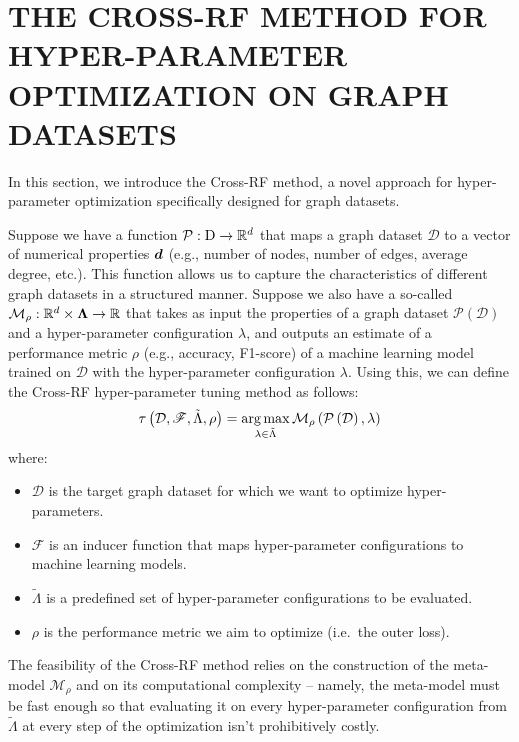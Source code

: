 \section{\uppercase{The Cross-RF Method for Hyper-Parameter Optimization on Graph Datasets}}

In this section, we introduce the Cross-RF method, a novel approach for hyper-parameter optimization specifically designed for graph datasets.

Suppose we have a  function \( \mathcal{P} : \mathrm{D} \to \mathbb{R}^d \) that maps a graph dataset \( \mathcal{D} \) to a vector of numerical properties \( \boldsymbol{d} \) (e.g., number of nodes, number of edges, average degree, etc.). This function allows us to capture the characteristics of different graph datasets in a structured manner. Suppose we also have a so-called  \( \mathcal{M}_\rho : \mathbb{R}^d \times \boldsymbol\Lambda \to \mathbb{R} \) that takes as input the properties of a graph dataset \( \mathcal{P} \left( \mathcal{D} \right) \) and a hyper-parameter configuration \( \lambda \), and outputs an estimate of a performance metric \( \rho \) (e.g., accuracy, F1-score) of a machine learning model trained on \( \mathcal{D} \) with the hyper-parameter configuration \( \lambda \). Using this, we can define the Cross-RF hyper-parameter tuning method as follows:
\begin{equation*}
	\tau \left( \mathcal{D}, \mathscr{F}, \tilde{\Lambda}, \rho \right) = \operatorname*{arg\,max}_{\lambda \in \tilde{\Lambda}} \mathcal{M}_\rho \left( \mathcal{P} \left( \mathcal{D} \right), \lambda \right)
\end{equation*}
where:
\begin{itemize}
	\item \( \mathcal{D} \) is the target graph dataset for which we want to optimize hyper-parameters.
	\item \( \mathscr{F} \) is an inducer function that maps hyper-parameter configurations to machine learning models.
	\item \( \tilde{\Lambda} \) is a predefined set of hyper-parameter configurations to be evaluated.
	\item \( \rho \) is the performance metric we aim to optimize (i.e.\ the outer loss).
\end{itemize}
The feasibility of the Cross-RF method relies on the construction of the meta-model \( \mathcal{M}_\rho \) and on its computational complexity -- namely, the meta-model must be fast enough so that evaluating it on every hyper-parameter configuration from \( \tilde{\Lambda} \) at every step of the optimization isn't prohibitively costly.

